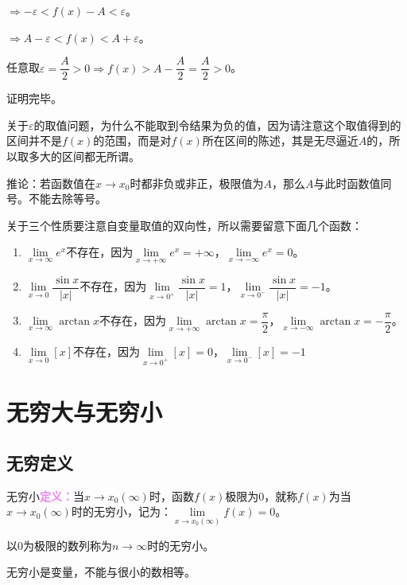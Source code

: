 \documentclass[UTF8, 12pt]{ctexart}
\begin{document}
$\Rightarrow -\varepsilon<f(x)-A<\varepsilon$。

$\Rightarrow A-\varepsilon<f(x)<A+\varepsilon$。

任意取$\varepsilon=\dfrac{A}{2}>0\Rightarrow f(x)>A-\dfrac{A}{2}=\dfrac{A}{2}>0$。

证明完毕。

关于$\varepsilon$的取值问题，为什么不能取到令结果为负的值，因为请注意这个取值得到的区间并不是$f(x)$的范围，而是对$f(x)$所在区间的陈述，其是无尽逼近$A$的，所以取多大的区间都无所谓。

推论：若函数值在$x\to x_0$时都非负或非正，极限值为$A$，那么$A$与此时函数值同号。不能去除等号。

\medskip

关于三个性质要注意自变量取值的双向性，所以需要留意下面几个函数：

\begin{enumerate}
    \item $\lim\limits_{x\to\infty}e^x$不存在，因为$\lim\limits_{x\to +\infty}e^x=+\infty$，$\lim\limits_{x\to -\infty}e^x=0$。
    \item $\lim\limits_{x\to 0}\dfrac{\sin x}{\vert x\vert}$不存在，因为$\lim\limits_{x\to 0^+}\dfrac{\sin x}{\vert x\vert}=1$，$\lim\limits_{x\to 0^-}\dfrac{\sin x}{\vert x\vert}=-1$。
    \item $\lim\limits_{x\to\infty}\arctan x$不存在，因为$\lim\limits_{x\to +\infty}\arctan x=\dfrac{\pi}{2}$，$\lim\limits_{x\to -\infty}\arctan x=-\dfrac{\pi}{2}$。
    \item $\lim\limits_{x\to 0}[x]$不存在，因为$\lim\limits_{x\to 0^+}[x]=0$，$\lim\limits_{x\to 0^-}[x]=-1$
\end{enumerate}

\section{无穷大与无穷小}

\subsection{无穷定义}

无穷小\textcolor{violet}{\textbf{定义：}}当$x\to x_0(\infty)$时，函数$f(x)$极限为0，就称$f(x)$为当$x\to x_0(\infty)$时的无穷小，记为：$\lim\limits_{x\to x_0(\infty)}f(x)=0$。

以0为极限的数列称为$n\to\infty$时的无穷小。

无穷小是变量，不能与很小的数相等。
\end{document}
